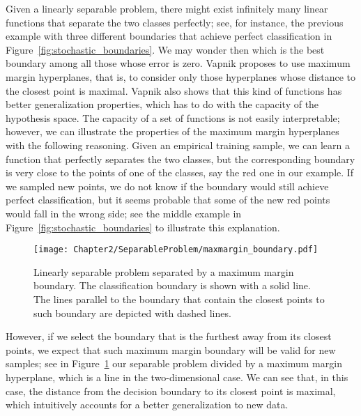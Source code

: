 Given a linearly separable problem, there might exist infinitely many linear functions that separate the two classes perfectly; see, for instance, the previous example with three different boundaries that achieve perfect classification in Figure~\ref{fig:stochastic_boundaries}.
We may wonder then which is the best boundary among all those whose error is zero. Vapnik proposes to use maximum margin hyperplanes, that is, to consider only those hyperplanes whose distance to the closest point is maximal.
Vapnik also shows that this kind of functions has better generalization properties, which has to do with the capacity of the hypothesis space.
%
The capacity of a set of functions is not easily interpretable; however, we can illustrate the properties of the maximum margin hyperplanes with the following reasoning. Given an empirical training sample, we can learn a function that perfectly separates the two classes, but the corresponding boundary is very close to the points of one of the classes, say the red one in our example. If we sampled new points, we do not know if the boundary would still achieve perfect classification, but it seems probable that some of the new red points would fall in the wrong side; see the middle example in Figure~\ref{fig:stochastic_boundaries} to illustrate this explanation.
%
%
\begin{figure}[t!]
    \centering
    \texttt{[image: Chapter2/SeparableProblem/maxmargin\_boundary.pdf]}
    \caption{Linearly separable problem separated by a maximum margin boundary. The classification boundary is shown with a solid line. The lines parallel to the boundary that contain the closest points to such boundary are depicted with dashed lines.}
    \label{fig:maxmargin_boundary}
\end{figure}
%
However, if we select the boundary that is the furthest away from its closest points, we expect that such maximum margin boundary will be valid for new samples;
see in Figure~\ref{fig:maxmargin_boundary} our separable problem divided by a maximum margin hyperplane, which is a line in the two-dimensional case. We can see that, in this case, the distance from the decision boundary to its closest point is maximal, which intuitively accounts for a better generalization to new data.

